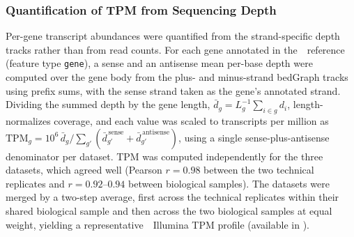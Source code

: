 \subsubsection{Quantification of TPM from Sequencing Depth}

Per-gene transcript abundances were quantified from the strand-specific depth tracks rather than from read counts.
For each gene annotated in the~\syn~reference (feature type \texttt{gene}), a sense and an antisense mean per-base depth were computed over the gene body from the plus- and minus-strand bedGraph tracks using prefix sums, with the sense strand taken as the gene's annotated strand.
Dividing the summed depth by the gene length, $\bar{d}_g = L_g^{-1}\sum_{i\in g} d_i$, length-normalizes coverage, and each value was scaled to transcripts per million as $\mathrm{TPM}_g = 10^{6}\,\bar{d}_g / \sum_{g'}(\bar{d}^{\,\mathrm{sense}}_{g'} + \bar{d}^{\,\mathrm{antisense}}_{g'})$, using a single sense-plus-antisense denominator per dataset.
TPM was computed independently for the three datasets, which agreed well (Pearson $r = 0.98$ between the two technical replicates and $r = 0.92$--$0.94$ between biological samples).
The datasets were merged by a two-step average, first across the technical replicates within their shared biological sample and then across the two biological samples at equal weight, yielding a representative~\syn~Illumina TPM profile (available in \sdomics).
